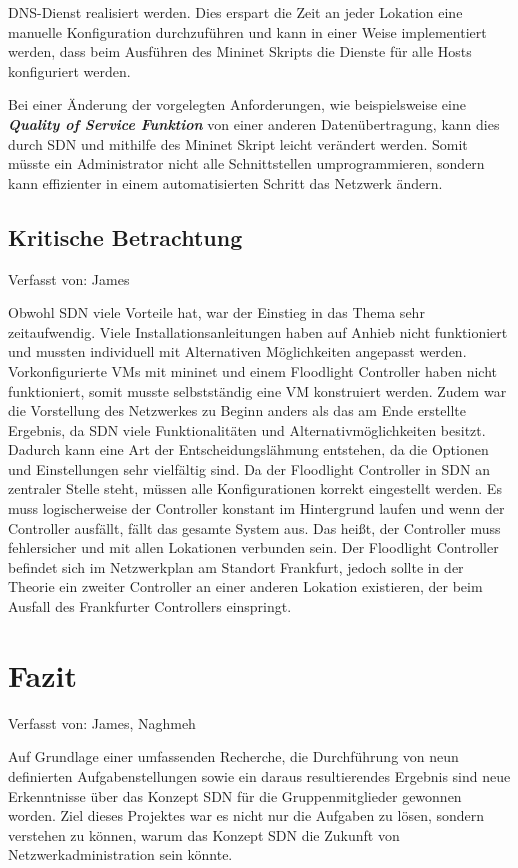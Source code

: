 \documentclass[fontsize=12pt,paper=a4,open=any,parskip=half,
  twoside=false,toc=listof,toc=bibliography,fleqn,leqno,
  captions=nooneline,captions=tableabove,british]{scrbook}
\begin{document}
{DNS-Dienst realisiert werden. Dies erspart die Zeit an jeder Lokation eine manuelle Konfiguration durchzuführen und kann in einer Weise implementiert werden, dass beim Ausführen des Mininet Skripts die Dienste für alle Hosts konfiguriert werden. \par
Bei einer Änderung der vorgelegten Anforderungen, wie beispielsweise eine \textit{\textbf{Quality of Service Funktion}} von einer anderen Datenübertragung, kann dies durch SDN und mithilfe des Mininet Skript leicht verändert werden. Somit müsste ein Administrator nicht alle Schnittstellen umprogrammieren, sondern kann effizienter in einem automatisierten Schritt das Netzwerk ändern.
\section{Kritische Betrachtung}
{\tiny Verfasst von: James\par}
Obwohl SDN viele Vorteile hat, war der Einstieg in das Thema sehr zeitaufwendig. Viele Installationsanleitungen haben auf Anhieb nicht funktioniert und mussten individuell mit Alternativen Möglichkeiten angepasst werden. Vorkonfigurierte VMs mit mininet und einem  Floodlight Controller haben nicht funktioniert, somit musste selbstständig eine VM konstruiert werden. Zudem war die Vorstellung des Netzwerkes zu Beginn anders als das am Ende erstellte Ergebnis, da SDN viele Funktionalitäten und Alternativmöglichkeiten besitzt. Dadurch kann eine Art der Entscheidungslähmung entstehen, da die Optionen und Einstellungen sehr vielfältig sind. Da der Floodlight Controller in SDN an zentraler Stelle steht, müssen alle Konfigurationen korrekt eingestellt werden. Es muss logischerweise der Controller konstant im Hintergrund laufen und wenn der Controller ausfällt, fällt das gesamte System aus. Das heißt, der Controller muss fehlersicher und mit allen Lokationen verbunden sein. Der Floodlight Controller befindet sich im Netzwerkplan am Standort Frankfurt, jedoch sollte in der Theorie ein zweiter Controller an einer anderen Lokation existieren, der beim Ausfall des Frankfurter Controllers einspringt.  

\chapter{Fazit}\label{ch:fazit}
{\tiny Verfasst von: James, Naghmeh \par}
Auf Grundlage einer umfassenden Recherche, die Durchführung von neun definierten Aufgabenstellungen sowie ein daraus resultierendes Ergebnis sind neue Erkenntnisse über das Konzept SDN für die Gruppenmitglieder gewonnen worden. Ziel dieses Projektes war es nicht nur die Aufgaben zu lösen, sondern verstehen zu können, warum das Konzept SDN die Zukunft von Netzwerkadministration sein könnte.   \par

}
\end{document}
